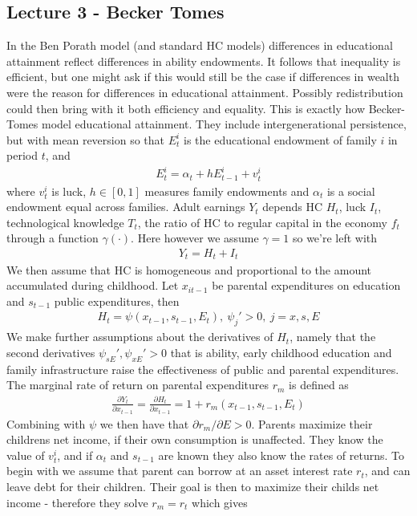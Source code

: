 \documentclass[12pt, a4paper]{article}
\begin{document}
\begin{multicols}{2}
\subsection{Lecture 3 - Becker Tomes}
In the Ben Porath model (and standard HC models) differences in educational attainment reflect differences in ability endowments. It follows that inequality is efficient, but one might ask if this would still be the case if differences in wealth were the reason for differences in educational attainment. Possibly redistribution could then bring with it both efficiency and equality. This is exactly how Becker-Tomes model educational attainment. They include intergenerational persistence, but with mean reversion so that $E_t^i$ is the educational endowment of family $i$ in period $t$, and 
\begin{align*}
E_t^i = \alpha_t + h E_{t-1}^i + v_t^i
\end{align*}
where $v_t^i$ is luck, $h\in [0,1]$ measures family endowments and  $\alpha_t$ is a social endowment equal across families. Adult earnings $Y_t$ depends HC $H_t$, luck $I_t$, technological knowledge $T_t$, the ratio of HC to regular capital in the economy $f_t$ through a function $\gamma(\cdot)$. Here however we assume $\gamma = 1$ so we're left with
\begin{align*}
Y_t = H_{t} + I_t
\end{align*}
We then assume that HC is homogeneous and proportional to the amount accumulated during childhood. Let $x_{it-1}$ be parental expenditures on education and $s_{t-1}$ public expenditures, then 
\begin{align*}
H_t = \psi (x_{t-1},s_{t-1},E_t), \ \psi_j' >0, \ j=x,s,E
\end{align*}
We make further assumptions about the derivatives of $H_t$, namely that the second derivatives $\psi_{sE}', \psi_{xE}'>0$ that is ability, early childhood education and family infrastructure raise the effectiveness of public and parental expenditures. The marginal rate of return on parental expenditures $r_m$ is defined as 
\begin{align*}
\frac{\partial Y_t}{\partial x_{t-1}} = \frac{\partial H_t}{\partial x_{t-1}} = 1+ r_m(x_{t-1}, s_{t-1},E_t)
\end{align*}
Combining with $\psi$ we then have that $\partial r_m / \partial E>0$. Parents maximize their childrens net income, if their own consumption is unaffected. They know the value of $v_t^i$, and if $\alpha_t$ and $s_{t-1}$ are known they also know the rates of returns. To begin with we assume that parent can borrow at an asset interest rate $r_t$, and can leave debt for their children. Their goal is then to maximize their childs net income - therefore they solve $r_m=r_t$ which gives 

\end{multicols}
\end{document}

